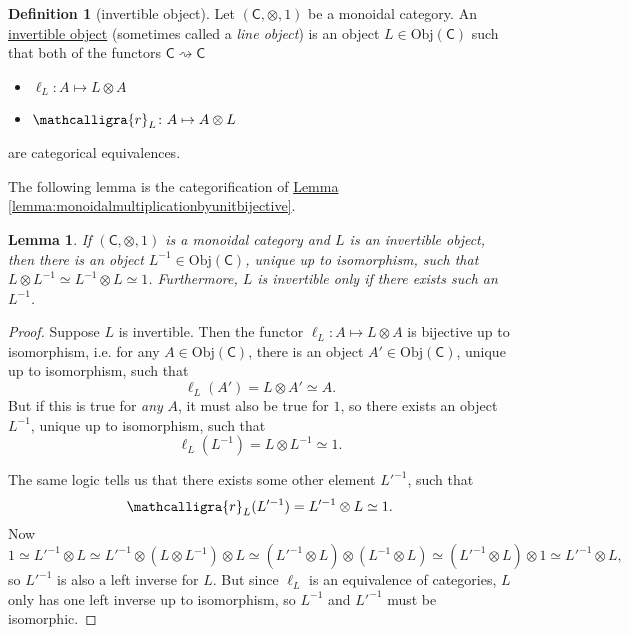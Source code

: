 \documentclass[a4paper,10pt]{scrreprt}
\newcommand{\sr}{\ensuremath{\mathcalligra{r}}}
\newcommand{\defn}[1]{\ul{#1}}
\newcommand{\Obj}{\mathrm{Obj}}
\theoremstyle{definition}
\newtheorem{definition}{Definition}[section]
\theoremstyle{plain}
\newtheorem{lemma}{Lemma}[section]
\theoremstyle{remark}
\begin{document}
\begin{definition}[invertible object]
  \label{def:invertibleobject}
  Let $(\mathsf{C}, \otimes, 1)$ be a monoidal category. An \defn{invertible object} (sometimes called a \emph{line object}) is an object $L \in \Obj(\mathsf{C})$ such that both of the functors $\mathsf{C} \rightsquigarrow \mathsf{C}$
  \begin{itemize}
    \item $\ell_{L}\colon A \mapsto L \otimes A$ 
    \item $\sr_{L}\colon A \mapsto A \otimes L$
  \end{itemize}
  are categorical equivalences.
\end{definition}

The following lemma is the categorification of \hyperref[lemma:monoidalmultiplicationbyunitbijective]{Lemma \ref*{lemma:monoidalmultiplicationbyunitbijective}}.
\begin{lemma}
  If $(\mathsf{C}, \otimes, 1)$ is a monoidal category and $L$ is an invertible object, then there is an object $L^{-1} \in \Obj(\mathsf{C})$, unique up to isomorphism, such that $L \otimes L^{-1} \simeq L^{-1} \otimes L \simeq 1$. Furthermore, $L$ is invertible only if there exists such an $L^{-1}$.
\end{lemma}
\begin{proof}
  Suppose $L$ is invertible. Then the functor $\ell_{L}\colon A \mapsto L \otimes A$ is bijective up to isomorphism, i.e. for any $A \in \Obj(\mathsf{C})$, there is an object $A' \in \Obj(\mathsf{C})$, unique up to isomorphism, such that
  \begin{equation*}
    \ell_{L}(A') = L \otimes A' \simeq A.
  \end{equation*}
  But if this is true for \emph{any} $A$, it must also be true for $1$, so there exists an object $L^{-1}$, unique up to isomorphism, such that
  \begin{equation*}
    \ell_{L}(L^{-1}) = L \otimes L^{-1} \simeq 1.
  \end{equation*}

  The same logic tells us that there exists some other element $L'^{-1}$, such that 
  \begin{equation*}
    \sr_{L}(L'^{-1}) = L'^{-1} \otimes L \simeq 1.
  \end{equation*}
  Now 
  \begin{equation*}
    1 \simeq L'^{-1} \otimes L \simeq L'^{-1} \otimes (L \otimes L^{-1}) \otimes L \simeq (L'^{-1} \otimes L) \otimes (L^{-1} \otimes L) \simeq (L'^{-1} \otimes L) \otimes 1 \simeq L'^{-1} \otimes L,
  \end{equation*}
  so $L'^{-1}$ is also a left inverse for $L$. But since $\ell_{L}$ is an equivalence of categories, $L$ only has one left inverse up to isomorphism, so $L^{-1}$ and $L'^{-1}$ must be isomorphic.
\end{proof}
\end{document}
